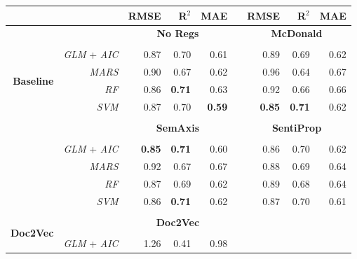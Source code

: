 \documentclass[a4paper, 12pt]{report}
\begin{document}
    
    \begin{table}[H]
    \centering
    \begin{threeparttable}
   \begin{tabular}{rrrrrrrrr}
      \hline
     & & \textbf{RMSE} & \textbf{R}$^2$ & \textbf{MAE} & & \textbf{RMSE} & \textbf{R}$^2$ & \textbf{MAE}\\ 
      \midrule
      \multirow{8}{*}{\textbf{Baseline}} & & \multicolumn{3}{c}{\textbf{No Regs}} & & \multicolumn{3}{c}{\textbf{McDonald}} \\
      \cmidrule{3-9}\\
      & \textit{GLM} + \textit{AIC} & 0.87 & 0.70 & 0.61 & & 0.89 & 0.69 & 0.62 \\ 
      & \textit{MARS} &  0.90 & 0.67 & 0.62 & & 0.96 & 0.64 & 0.67 \\ 
      & \textit{RF} & 0.86 & \textbf{0.71} & 0.63 & & 0.92 & 0.66 & 0.66 \\ 
      & \textit{SVM} & 0.87 & 0.70 & \textbf{0.59} & & \textbf{0.85} & \textbf{0.71} & 0.62 \\ 
      \multicolumn{9}{c}{} \\
      \multirow{8}{*}{\textbf{ID}} & & \multicolumn{3}{c}{\textbf{SemAxis}} & & \multicolumn{3}{c}{\textbf{SentiProp}} \\
      \cmidrule{3-9}\\
       & \textit{GLM} + \textit{AIC} & \textbf{0.85} & \textbf{0.71} & 0.60 & & 0.86 & 0.70 & 0.62 \\ 
      & \textit{MARS} & 0.92 & 0.67 & 0.67 & & 0.88 & 0.69 & 0.64 \\ 
      & \textit{RF} &  0.87 & 0.69 & 0.62 & & 0.89 & 0.68 & 0.64 \\ 
      & \textit{SVM} & 0.86 & \textbf{0.71} & 0.62 & & 0.87 & 0.70 & 0.61 \\
      \multicolumn{9}{c}{} \\
      \multirow{8}{*}{\textbf{Doc2Vec}} & & \multicolumn{3}{c}{\textbf{Doc2Vec}} & & \multicolumn{3}{c}{\textbf{}} \\
       \cmidrule{3-9}\\
      & \textit{GLM} + \textit{AIC} & 1.26 & 0.41 & 0.98 & \multicolumn{4}{c}{} \\ 

\end{tabular}
\end{threeparttable}
\end{table}
\end{document}

